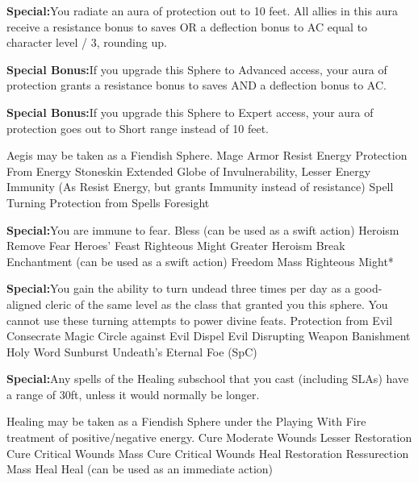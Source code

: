 \textbf{Special:}{You radiate an aura of protection out to 10 feet. All allies in this aura receive a resistance bonus to saves OR a deflection bonus to AC equal to character level / 3, rounding up.}

\textbf{Special Bonus:}{If you upgrade this Sphere to Advanced access, your aura of protection grants a resistance bonus to saves AND a deflection bonus to AC.}

\textbf{Special Bonus:}{If you upgrade this Sphere to Expert access, your aura of protection goes out to Short range instead of 10 feet.}

Aegis may be taken as a Fiendish Sphere.
\sphere
{Mage Armor}
{Resist Energy}
{Protection From Energy}
{Stoneskin}
{Extended Globe of Invulnerability, Lesser}
{Energy Immunity (As Resist Energy, but grants Immunity instead of resistance)}
{Spell Turning}
{Protection from Spells}
{Foresight}

\textbf{Special:}{You are immune to fear.}
\sphere
{Bless (can be used as a swift action)}
{Heroism}
{Remove Fear}
{Heroes' Feast}
{Righteous Might}
{Greater Heroism}
{Break Enchantment (can be used as a swift action)}
{Freedom}
{Mass Righteous Might*}

\textbf{Special:}{You gain the ability to turn undead three times per day as a good-aligned cleric of the same level as the class that granted you this sphere. You cannot use these turning attempts to power divine feats.}
\sphere
{Protection from Evil}
{Consecrate}
{Magic Circle against Evil}
{Dispel Evil}
{Disrupting Weapon}
{Banishment}
{Holy Word}
{Sunburst}
{Undeath's Eternal Foe (SpC)}

\textbf{Special:}{Any spells of the Healing subschool that you cast (including SLAs) have a range of 30ft, unless it would normally be longer.}

Healing may be taken as a Fiendish Sphere under the Playing With Fire treatment of positive/negative energy.
\sphere
{Cure Moderate Wounds}
{Lesser Restoration}
{Cure Critical Wounds}
{Mass Cure Critical Wounds}
{Heal}
{Restoration}
{Ressurection}
{Mass Heal}
{Heal (can be used as an immediate action)}

